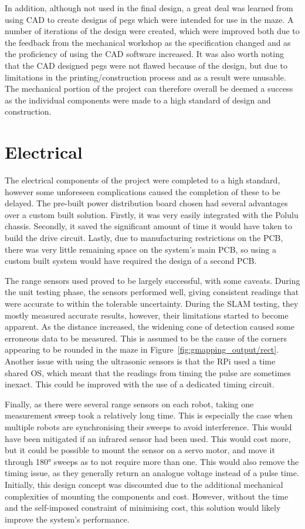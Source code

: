 In addition, although not used in the final design, a great deal was learned from
using CAD to create designs of pegs which were intended for use in the maze. A number
of iterations of the design were created, which were improved both due to the feedback from the mechanical workshop as the specification changed and as the proficiency of using the CAD software increased. It was also worth noting that the CAD designed pegs were not flawed
because of the design, but due to limitations in the printing/construction process and as a result were unusable.
The mechanical portion of the project can therefore overall be deemed a success as
the individual components were made to a high standard of design and construction.

\section{Electrical}\label{eval/elec}
The electrical components of the project were completed to a high standard,
however some unforeseen complications caused the completion of these to be delayed. The pre-built power distribution board chosen had several advantages over a
custom built solution. Firstly, it was very easily integrated with the Polulu
chassis. Secondly, it saved the significant amount of time it would have taken
to build the drive circuit. Lastly, due to manufacturing restrictions on the PCB,
there was very little remaining space on the system's main PCB, so using a custom
built system would have required the design of a second PCB.

The range sensors used proved to be largely successful, with some caveats.
During the unit testing phase, the sensors performed well, giving consistent
readings that were accurate to within the tolerable uncertainty. During the SLAM testing,
they mostly measured accurate results, however, their limitations started to
become apparent. As the distance increased, the widening cone of detection caused some
erroneous data to be measured. This is assumed to be the cause of the corners
appearing to be rounded in the maze in Figure~\ref{fig:gmapping_output/rect}. Another issue with using the ultrasonic sensors is that the RPi used a time
shared OS, which meant that the readings from timing the pulse are sometimes inexact. This could be improved with the use of
a dedicated timing circuit.

Finally, as there were several range sensors on each
robot, taking one measurement sweep took a relatively long time. This is
especially the case when multiple robots are synchronising their sweeps to avoid
interference. This would have been mitigated if an infrared sensor had been used.
This would cost more, but it could be possible to mount the sensor on a servo
motor, and move it through \ang{180} sweeps as to not require more than one.
This would also remove the timing issue, as they generally return an analogue
voltage instead of a pulse time. Initially, this design concept was discounted due to the additional mechanical complexities of mounting the components and
cost. However, without the time and the self-imposed constraint of minimising cost, this solution would
likely improve the system's performance.

